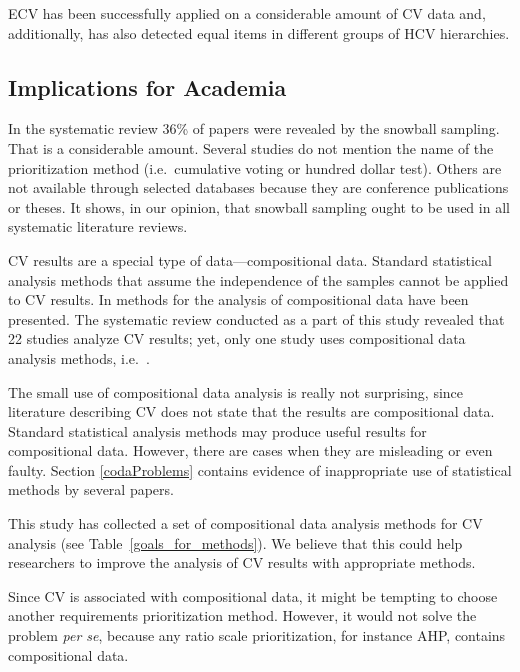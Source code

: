 ECV has been successfully applied on a considerable amount of CV data and, additionally, has also detected equal items in different groups of HCV hierarchies.

\subsection{Implications for Academia}
In the systematic review 36\% of papers were revealed by the snowball sampling.
That is a considerable amount.
Several studies do not mention the name of the prioritization method (i.e.\ cumulative voting or hundred dollar test).
Others are not available through selected databases because they are conference publications or theses.
It shows, in our opinion, that snowball sampling ought to be used in all systematic literature reviews.

CV results are a special type of data---compositional data.
Standard statistical analysis methods that assume the independence of the samples cannot be applied to CV results.
In \citep{Aitchison1986} methods for the analysis of compositional data have been presented.
The systematic review conducted as a part of this study revealed that 22 studies analyze CV results; yet, only one study uses compositional data analysis methods, i.e.\ \citep{Chatzipetrou2010}.%

The small use of compositional data analysis is really not surprising, since literature describing CV does not state that the results are compositional data.
Standard statistical analysis methods may produce useful results for compositional data.
However, there are cases when they are misleading or even faulty.
Section \ref{codaProblems} contains evidence of inappropriate use of statistical methods by several papers.

This study has collected a set of compositional data analysis methods for CV analysis (see Table~\ref{goals_for_methods}). 
We believe that this could help researchers to improve the analysis of CV results with appropriate methods.

Since CV is associated with compositional data, it might be tempting to choose another requirements prioritization method. However, it would not solve the problem \emph{per se}, because any ratio scale prioritization, for instance AHP, contains compositional data.

